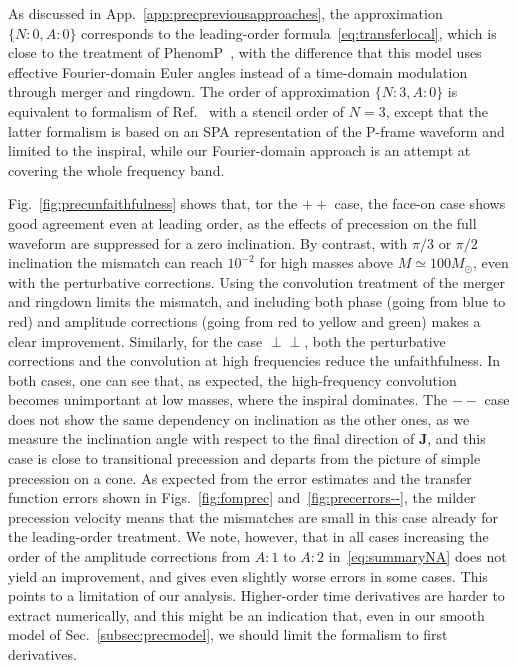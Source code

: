 \documentclass[aps,showpacs,twocolumn,
prd,superscriptaddress,nofootinbib]{revtex4-1}
\newcommand{\Msol}{M_{\odot}}
\begin{document}
As discussed in App.~\ref{app:precpreviousapproaches}, the approximation $\{N:0,A:0\}$ corresponds to the leading-order formula~\eqref{eq:transferlocal}, which is close to the treatment of PhenomP~\cite{Hannam+13}, with the difference that this model uses effective Fourier-domain Euler angles instead of a time-domain modulation through merger and ringdown. The order of approximation $\{N:3,A:0\}$ is equivalent to formalism of Ref.~\cite{KCY14} with a stencil order of $N=3$, except that the latter formalism is based on an SPA representation of the P-frame waveform and limited to the inspiral, while our Fourier-domain approach is an attempt at covering the whole frequency band.

Fig.~\ref{fig:precunfaithfulness} shows that, tor the $++$ case, the face-on case shows good agreement even at leading order, as the effects of precession on the full waveform are suppressed for a zero inclination. By contrast, with $\pi/3$ or $\pi/2$ inclination the mismatch can reach $10^{-2}$ for high masses above $M \simeq 100 \Msol$, even with the perturbative corrections. Using the convolution treatment of the merger and ringdown limits the mismatch, and including both phase (going from blue to red) and amplitude corrections (going from red to yellow and green) makes a clear improvement. Similarly, for the case $\perp\perp$, both the perturbative corrections and the convolution at high frequencies reduce the unfaithfulness. In both cases, one can see that, as expected, the high-frequency convolution becomes unimportant at low masses, where the inspiral dominates. The $--$ case does not show the same dependency on inclination as the other ones, as we measure the inclination angle with respect to the final direction of $\bm{J}$, and this case is close to transitional precession and departs from the picture of simple precession on a cone. As expected from the error estimates and the transfer function errors shown in Figs.~\ref{fig:fomprec} and~\ref{fig:precerrors--}, the milder precession velocity means that the mismatches are small in this case already for the leading-order treatment. We note, however, that in all cases increasing the order of the amplitude corrections from $A:1$ to $A:2$ in~\eqref{eq:summaryNA} does not yield an improvement, and gives even slightly worse errors in some cases. This points to a limitation of our analysis. Higher-order time derivatives are harder to extract numerically, and this might be an indication that, even in our smooth model of Sec.~\ref{subsec:precmodel}, we should limit the formalism to first derivatives.
\end{document}
